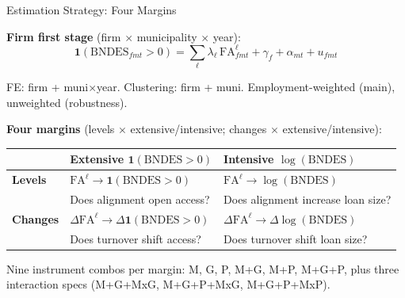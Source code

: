 \documentclass[aspectratio=169,11pt]{beamer}
\newcommand{\FA}{\mathrm{FA}}
\begin{document}
\begin{frame}{Estimation Strategy: Four Margins}

\textbf{Firm first stage} (firm $\times$ municipality $\times$ year):
\begin{equation*}
    \mathbf{1}(\text{BNDES}_{fmt} > 0) = \sum_\ell \lambda_\ell\, \FA^\ell_{fmt}
    + \gamma_f + \alpha_{mt} + u_{fmt}
\end{equation*}

\vspace{-6pt}
{\small FE: firm + muni$\times$year. Clustering: firm + muni. Employment-weighted (main), unweighted (robustness).}

\medskip

\textbf{Four margins} (levels $\times$ extensive/intensive; changes $\times$ extensive/intensive):

\smallskip

\begin{center}
\footnotesize
\begin{tabular}{l >{\centering\arraybackslash}p{5.5cm} >{\centering\arraybackslash}p{5.5cm}}
\toprule
& \textbf{Extensive} $\mathbf{1}(\text{BNDES}>0)$ & \textbf{Intensive} $\log(\text{BNDES})$ \\
\midrule
\textbf{Levels}  & $\FA^\ell \to \mathbf{1}(\text{BNDES}>0)$     & $\FA^\ell \to \log(\text{BNDES})$ \\
                 & Does alignment open access?                      & Does alignment increase loan size? \\[4pt]
\textbf{Changes} & $\Delta\FA^\ell \to \Delta\mathbf{1}(\text{BNDES}>0)$ & $\Delta\FA^\ell \to \Delta\log(\text{BNDES})$ \\
                 & Does turnover shift access?                      & Does turnover shift loan size? \\
\bottomrule
\end{tabular}
\end{center}

\medskip

Nine instrument combos per margin: M, G, P, M+G, M+P, M+G+P, plus three interaction specs (M+G+MxG, M+G+P+MxG, M+G+P+MxP).

\end{frame}

\end{document}

